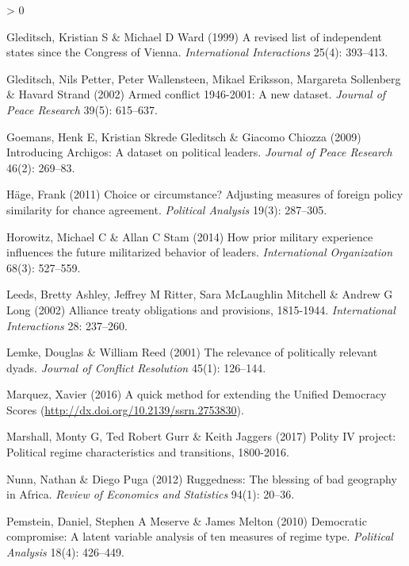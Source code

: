 \documentclass[
  11pt,
]{article}
\newlength{\cslhangindent}
\newenvironment{CSLReferences}[2] %
 {%
  \setlength{\parindent}{0pt}
  \ifodd #1 \everypar{\setlength{\hangindent}{\cslhangindent}}\ignorespaces\fi
  \ifnum #2 > 0
  \setlength{\parskip}{#2\baselineskip}
  \fi
 }%
 {}
\begin{document}
\begin{CSLReferences}{1}{0}
\leavevmode\hypertarget{ref-gledtischward1999rlis}{}%
Gleditsch, Kristian S \& Michael D Ward (1999) A revised list of independent states since the {C}ongress of {V}ienna. \emph{International Interactions} 25(4): 393--413.

\leavevmode\hypertarget{ref-gleditschetal2002ac}{}%
Gleditsch, Nils Petter, Peter Wallensteen, Mikael Eriksson, Margareta Sollenberg \& Havard Strand (2002) Armed conflict 1946-2001: A new dataset. \emph{Journal of Peace Research} 39(5): 615--637.

\leavevmode\hypertarget{ref-goemansetal2009ia}{}%
Goemans, Henk E, Kristian Skrede Gleditsch \& Giacomo Chiozza (2009) Introducing {A}rchigos: A dataset on political leaders. \emph{Journal of Peace Research} 46(2): 269--83.

\leavevmode\hypertarget{ref-haege2011cc}{}%
Häge, Frank (2011) Choice or circumstance? Adjusting measures of foreign policy similarity for chance agreement. \emph{Political Analysis} 19(3): 287--305.

\leavevmode\hypertarget{ref-horowitzstam2014hpme}{}%
Horowitz, Michael C \& Allan C Stam (2014) How prior military experience influences the future militarized behavior of leaders. \emph{International Organization} 68(3): 527--559.

\leavevmode\hypertarget{ref-leedsetal2002atop}{}%
Leeds, Bretty Ashley, Jeffrey M Ritter, Sara McLaughlin Mitchell \& Andrew G Long (2002) Alliance treaty obligations and provisions, 1815-1944. \emph{International Interactions} 28: 237--260.

\leavevmode\hypertarget{ref-lemkereed2001rprd}{}%
Lemke, Douglas \& William Reed (2001) The relevance of politically relevant dyads. \emph{Journal of Conflict Resolution} 45(1): 126--144.

\leavevmode\hypertarget{ref-marquez2016qme}{}%
Marquez, Xavier (2016) A quick method for extending the {U}nified {D}emocracy {S}cores (\url{http://dx.doi.org/10.2139/ssrn.2753830}).

\leavevmode\hypertarget{ref-marshalletal2017p}{}%
Marshall, Monty G, Ted Robert Gurr \& Keith Jaggers (2017) Polity {IV} project: Political regime characteristics and transitions, 1800-2016.

\leavevmode\hypertarget{ref-nunnpuga2012r}{}%
Nunn, Nathan \& Diego Puga (2012) Ruggedness: The blessing of bad geography in {A}frica. \emph{Review of Economics and Statistics} 94(1): 20--36.

\leavevmode\hypertarget{ref-pemsteinetal2010dc}{}%
Pemstein, Daniel, Stephen A Meserve \& James Melton (2010) Democratic compromise: A latent variable analysis of ten measures of regime type. \emph{Political Analysis} 18(4): 426--449.


\end{CSLReferences}
\end{document}
